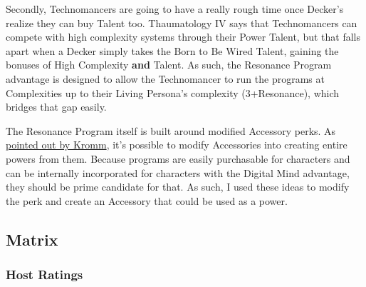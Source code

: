 \begin{multicols*}{2}
	Secondly, Technomancers are going to have a really rough time once Decker's realize they can buy Talent too. Thaumatology IV says that Technomancers can compete with high complexity systems through their Power Talent, but that falls apart when a Decker simply takes the Born to Be Wired Talent, gaining the bonuses of High Complexity \textbf{and} Talent. As such, the Resonance Program advantage is designed to allow the Technomancer to run the programs at Complexities up to their Living Persona's complexity (3+Resonance), which bridges that gap easily.
	
	The Resonance Program itself is built around modified Accessory perks. As \textcolor{NavyBlue}{\href{http://forums.sjgames.com/showpost.php?p=561052&postcount=8}{pointed out by Kromm}}, it's possible to modify Accessories into creating entire powers from them. Because programs are easily purchasable for characters and can be internally incorporated for characters with the Digital Mind advantage, they should be prime candidate for that. As such, I used these ideas to modify the perk and create an Accessory that could be used as a power.	
	
	\subsection{Matrix}
	
	\subsubsection{Host Ratings} \label{Host Ratings BTS}
	

\end{multicols*}
